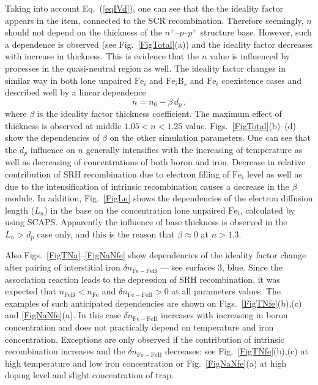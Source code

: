 ﻿\documentclass[12pt]{article}
\begin{document}
Taking into account Eq.~(\ref{eqIVd}), one can see that
the the ideality factor appears in the item, connected to the SCR recombination.
Therefore seemingly, $n$ should not depend on the thickness of the $n^+$--$p$--$p^+$ structure base.
However, such a dependence is observed (see Fig.~\ref{FigTotal}(a))
and the ideality factor decreases with increase in thickness.
This is evidence that the $n$ value is influenced by processes in the quasi-neutral region as well.
The ideality factor changes in similar way
in both lone unpaired $\mathrm{Fe}_i$ and $\mathrm{Fe}_i\mathrm{B}_s$ and $\mathrm{Fe}_i$ coexistence cases
and described well by a linear dependence
\begin{equation}
\label{eqN_D}
    n=n_0-\beta\,d_p\,.
\end{equation}
where
$\beta$ is the ideality factor thickness coefficient.
The maximum effect of thickness is observed at middle $1.05<n<1.25$ value.
Figs.~\ref{FigTotal}(b)--(d) show the dependencies of $\beta$ on the other simulation parameters.
One can see that the $d_p$ influence  on $n$ generally intensifies with the increasing of temperature as well as
decreasing of concentrations of both boron and iron.
Decrease in relative contribution of SRH recombination due to electron filling of $\mathrm{Fe}_i$ level as well as
due to the intensification of intrinsic recombination causes a decrease in the $\beta$ module.
In addition, Fig.~\ref{FigLn} shows the dependencies of the electron diffusion length ($ L_n $) in the base on the concentration
lone unpaired $\mathrm{Fe}_i$, calculated by using SCAPS.
Apparently the influence of base thickness is observed in the $L_n>d_p$ case only,
and this is the reason that  $\beta\approx0$ at $n>1.3$.


Also Figs.~\ref{FigTNa}--\ref{FigNaNfe} show dependencies of the ideality factor change
after pairing of interstitial iron $\delta n_\mathrm{Fe-FeB}$
--- see surfaces 3, blue.
Since the association reaction leads to the depression of SRH recombination, it was expected that
$n_\mathrm{FeB}<n_\mathrm{Fe}$ and $\delta n_\mathrm{Fe-FeB}>0$ at all parameters values.
The examples of such anticipated dependencies are shown on Figs.~\ref{FigTNfe}(b),(c) and \ref{FigNaNfe}(a).
In this case $\delta n_\mathrm{Fe-FeB}$ increases with increasing in boron concentration and does not practically depend
on temperature and iron concentration.
Exceptions are only observed if the contribution of intrinsic recombination increases and the $\delta n_\mathrm{Fe-FeB}$ decreases:
see Fig.~\ref{FigTNfe}(b),(c) at high temperature and low iron concentration
or Fig.~\ref{FigNaNfe}(a) at high doping level and slight concentration of trap.
\end{document}
